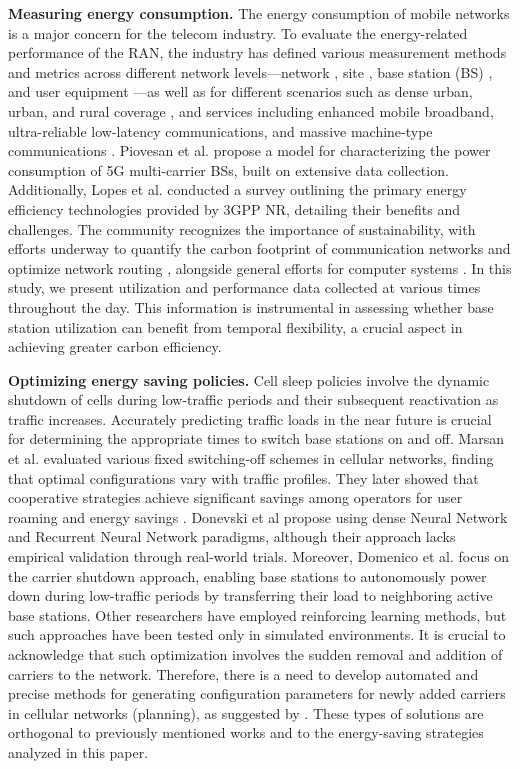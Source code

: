 \textbf{Measuring energy consumption.} The energy consumption of mobile networks is a major concern for the telecom industry. To evaluate the energy-related performance of the RAN, the industry has defined various measurement methods and metrics across different network levels—network \cite{ETSI2020a}, site \cite{ITU2016}, base station (BS) \cite{ETSI2020b}, and user equipment \cite{3GPP2019}—as well as for different scenarios such as dense urban, urban, and rural coverage \cite{ETSI2020a}, and services including enhanced mobile broadband, ultra-reliable low-latency communications, and massive machine-type communications \cite{3GPP2021}. Piovesan et al. \cite{Piovesan2022} propose a model for characterizing the power consumption of 5G multi-carrier BSs, built on extensive data collection. Additionally, Lopes et al. \cite{survey_5g_energy_efficiency} conducted a survey outlining the primary energy efficiency technologies provided by 3GPP NR, detailing their benefits and challenges. The community recognizes the importance of sustainability, with efforts underway to quantify the carbon footprint of communication networks \cite{IEA2024} and optimize network routing \cite{zilberman23}, alongside general efforts for computer systems \cite{CarbonScaler}. In this study, we present utilization and performance data collected at various times throughout the day. This information is instrumental in assessing whether base station utilization can benefit from temporal flexibility, a crucial aspect in achieving greater carbon efficiency.

\textbf{Optimizing energy saving policies.} Cell sleep policies involve the dynamic shutdown of cells during low-traffic periods and their subsequent reactivation as traffic increases. Accurately predicting traffic loads in the near future is crucial for determining the appropriate times to switch base stations on and off. Marsan et al. \cite{Marsan2009}\cite{Marsan2012} evaluated various fixed switching-off schemes in cellular networks, finding that optimal configurations vary with traffic profiles. They later showed that cooperative strategies achieve significant savings among operators for user roaming and energy savings \cite{Marsan2010}. Donevski et al \cite{Donevski2019} propose using dense Neural Network and Recurrent Neural Network paradigms, although their approach lacks empirical validation through real-world trials. Moreover, Domenico et al. \cite{user_transfer_5g} focus on the carrier shutdown approach, enabling base stations to autonomously power down during low-traffic periods by transferring their load to neighboring active base stations. Other researchers have employed reinforcing learning methods\cite{rl2020}\cite{rl2021}, but such approaches have been tested only in simulated environments. It is crucial to acknowledge that such optimization involves the sudden removal and addition of carriers to the network. Therefore, there is a need to develop automated and precise methods for generating configuration parameters for newly added carriers in cellular networks (\ie planning), as suggested by \cite{auric}. These types of solutions are orthogonal to previously mentioned works and to the energy-saving strategies analyzed in this paper.
